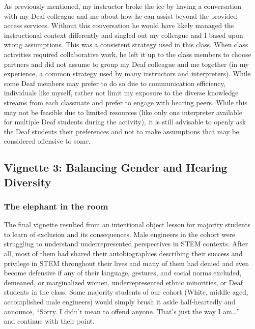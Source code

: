 \documentclass[11.5pt]{sig-alternate} %
\begin{document}
\begin{large}
As previously mentioned, my instructor broke the ice by having a conversation with my Deaf colleague and me about how he can assist beyond the provided access services. Without this conversation he would have likely managed the instructional context differently and singled out my colleague and I based upon wrong assumptions.  This was a consistent strategy used in this class. When class activities required collaborative work, he left it up to the class members to choose partners and did not assume to group my Deaf colleague and me together (in my experience, a common strategy used by many instructors and interpreters).  While some Deaf members may prefer to do so due to communication efficiency, individuals like myself, rather not limit my exposure to the diverse knowledge streams from each classmate and prefer to engage with hearing peers.  While this may not be feasible due to limited resources (like only one interpreter available for multiple Deaf students during the activity), it is still advisable to openly ask the Deaf students their preferences and not to make assumptions that may be considered offensive to some.  

\subsection*{Vignette 3: Balancing Gender and Hearing Diversity}

\subsubsection*{The elephant in the room}

The final vignette resulted from an intentional object lesson for majority students to learn of exclusion and its consequences.  Male engineers in the cohort were struggling to understand underrepresented perspectives in STEM contexts.  After all, most of them had shared their autobiographies describing their success and privilege in STEM throughout their lives and many of them had denied and even become defensive if any of their language, gestures, and social norms excluded, demeaned, or marginalized women, underrepresented ethnic minorities, or Deaf students in the class.   Some majority students of our cohort (White, middle aged, accomplished male engineers) would simply brush it aside half-heartedly and announce, “Sorry.  I didn’t mean to offend anyone.  That’s just the way I am…” and continue with their point.


\end{large}
\end{document}
